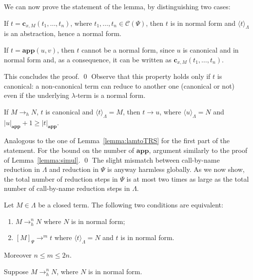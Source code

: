 \documentclass{LMCS}
\newcommand{\varone}{x}
\newcommand{\lambdaone}{M}
\newcommand{\lambdatwo}{N}
\newcommand{\termone}{t}
\newcommand{\termtwo}{u}
\newcommand{\termthree}{v}
\newcommand{\appTRS}{\mathbf{app}}
\newcommand{\constr}[2]{\mathbf{c}_{#1,#2}}
\newcommand{\TRSWtolambda}[1]{\langle #1\rangle_{\Lambdaterms}}
\newcommand{\LambdatoTRSW}[1]{[#1]_{\Psi}}
\newcommand{\Lambdaterms}{\Lambda}
\newcommand{\TRSW}{\Psi}
\newcommand{\TRSWconterms}{\mathcal{C}(\Psi)}
\newcommand{\rewrTRSW}{\rightarrow}
\newcommand{\rewrlambdah}{\rightarrow_h}
\newcommand{\plength}[2]{|#1|_{#2}}
\newenvironment{varitemize}
{
\begin{list}{\labelitemi}
{\setlength{\itemsep}{0.0mm}
 \setlength{\topsep}{0.0mm}
 \setlength{\parindent}{0.0mm}
 \setlength{\parskip}{0.0mm}
 \setlength{\parsep}{0.0mm}
 \setlength{\partopsep}{0.0mm}
 \setlength{\leftmargin}{15pt}
 \setlength{\labelsep}{5pt}
 \setlength{\labelwidth}{10pt}}}
{
 \end{list} 
}
\newcounter{number}
\begin{document}
We can now prove the statement of the lemma, by distinguishing two cases:
\begin{varitemize}
\item
  If $\termone=\constr{\varone}{\lambdaone}(\termone_1,\ldots,\termone_n)$,
  where $\termone_1,\ldots,\termone_n\in\TRSWconterms$, then
  $\termone$ is in normal form and $\TRSWtolambda{\termone}$ is an
  abstraction, hence a normal form.
\item
  If $\termone=\appTRS(\termtwo,\termthree)$, then $\termone$ cannot be a normal form,
  since $\termtwo$ is canonical and in normal form and, as a consequence,
  it can be written as $\constr{\varone}{\lambdaone}(\termone_1,\ldots,\termone_n)$.
\end{varitemize}
This concludes the proof.
\qed
Observe that this property holds only if $\termone$ is canonical: a non-canonical term
can reduce to another one (canonical or not) even if the underlying $\lambda$-term
is a normal form.
\begin{lem}\label{lemma:lamtoTRSW}
If $\lambdaone\rewrlambdah\lambdatwo$, $\termone$ is canonical and $\TRSWtolambda{\termone}=\lambdaone$,
then $\termone\rewrTRSW\termtwo$, where $\TRSWtolambda{\termtwo}=\lambdatwo$ and 
$\plength{\termtwo}{\appTRS}+1\geq\plength{\termone}{\appTRS}$.
\end{lem}
\proof
Analogous to the one of Lemma~\ref{lemma:lamtoTRS} for the first part of the statement.
For the bound on the number of $\appTRS$, argument similarly to the proof
of Lemma~\ref{lemma:simul}.
\qed
The slight mismatch between call-by-name reduction in $\Lambdaterms$ and
reduction in $\TRSW$ is anyway harmless globally. As we now show, the total number of reduction
steps in $\TRSW$ is at most two times as large as the total number of call-by-name reduction
steps in $\Lambdaterms$.
\begin{thm}
Let $\lambdaone\in\Lambdaterms$ be a closed term. The following
two conditions are equivalent:
\begin{enumerate}[\em 1.]
\item
  $\lambdaone\rewrlambdah^n\lambdatwo$ where $\lambdatwo$ is in normal form;
\item
  $\LambdatoTRSW{\lambdaone}\rewrTRSW^m\termone$ where
  $\TRSWtolambda{\termone}=\lambdatwo$ and $\termone$ is in normal form.
\end{enumerate}
Moreover $n\leq m\leq 2n$.
\end{thm}
\proof
Suppose $\lambdaone\rewrlambdah^n\lambdatwo$, where $\lambdatwo$ is in normal form.
\end{document}
